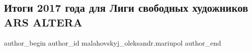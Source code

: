  
 
 
 
 
 
\subsection{Итоги 2017 года для Лиги свободных художников ARS ALTERA}
\label{sec:13_01_2018.fb.malahovskyj_oleksandr.mariupol.1.ars_altera}
 
\ifcmt
 author_begin
   author_id malahovskyj_oleksandr.mariupol
 author_end
\fi
